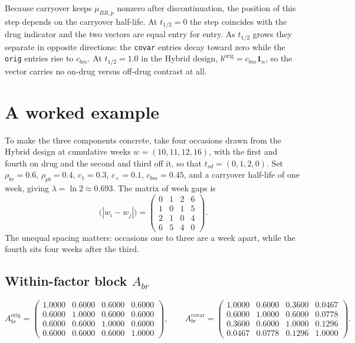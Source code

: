 \documentclass[11pt]{article}
\begin{document}
Because carryover keeps $\mu_{BR,p}$ nonzero after discontinuation,
the position of this step depends on the carryover half-life. At
$t_{1/2} = 0$ the step coincides with the drug indicator and the two
vectors are equal entry for entry. As $t_{1/2}$ grows they separate in
opposite directions: the \texttt{covar} entries decay toward zero
while the \texttt{orig} entries rise to $c_{bm}$. At
$t_{1/2} = 1.0$ in the Hybrid design, $b^{\text{orig}} = c_{bm}
\mathbf{1}_n$, so the vector carries no on-drug versus off-drug
contrast at all.

\section{A worked example}

To make the three components concrete, take four occasions drawn from
the Hybrid design at cumulative weeks
$w = (10, 11, 12, 16)$, with the first and fourth on drug and the
second and third off it, so that
$t_{sd} = (0, 1, 2, 0)$. Set $\rho_{br} = 0.6$, $\rho_{pb} = 0.4$,
$c_1 = 0.3$, $c_{\times} = 0.1$, $c_{bm} = 0.45$, and a carryover
half-life of one week, giving $\lambda = \ln 2 \approx 0.693$. The
matrix of week gaps is
\[
\bigl(|w_i - w_j|\bigr) =
\begin{pmatrix}
0 & 1 & 2 & 6\\
1 & 0 & 1 & 5\\
2 & 1 & 0 & 4\\
6 & 5 & 4 & 0
\end{pmatrix}.
\]
The unequal spacing matters: occasions one to three are a week apart,
while the fourth sits four weeks after the third.

\subsection{Within-factor block $A_{br}$}

\[
A_{br}^{\text{orig}} =
\begin{pmatrix}
1.0000 & 0.6000 & 0.6000 & 0.6000 \\
0.6000 & 1.0000 & 0.6000 & 0.6000 \\
0.6000 & 0.6000 & 1.0000 & 0.6000 \\
0.6000 & 0.6000 & 0.6000 & 1.0000
\end{pmatrix},
\qquad
A_{br}^{\text{covar}} =
\begin{pmatrix}
1.0000 & 0.6000 & 0.3600 & 0.0467 \\
0.6000 & 1.0000 & 0.6000 & 0.0778 \\
0.3600 & 0.6000 & 1.0000 & 0.1296 \\
0.0467 & 0.0778 & 0.1296 & 1.0000
\end{pmatrix}.
\]
\end{document}

